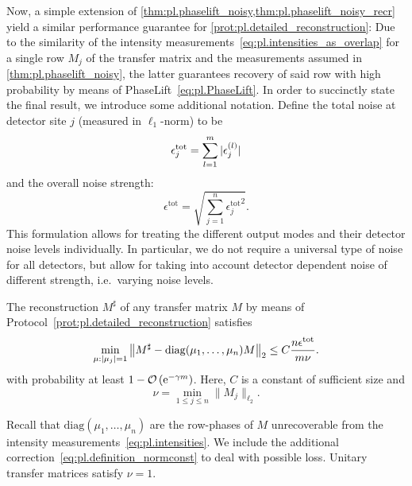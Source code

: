 Now, a simple extension of \cref{thm:pl.phaselift_noisy,thm:pl.phaselift_noisy_recr} yield a similar performance guarantee for \cref{prot:pl.detailed_reconstruction}:
Due to the similarity of the intensity measurements~\eqref{eq:pl.intensities_as_overlap} for a single row $M_j$ of the transfer matrix and the measurements assumed in \cref{thm:pl.phaselift_noisy}, the latter guarantees recovery of said row with high probability by means of PhaseLift~\eqref{eq:pl.PhaseLift}.
In order to succinctly state the final result, we introduce some additional notation.
Define the total noise at detector site $j$ (measured in $\ell_1$-norm) to be
\[
  \epsilon_j^{\mathrm{tot}}= \sum_{l=1}^m {\vert\epsilon_j^{(l)}\vert}
  \label{eq:pl.error_term_summand}
\]
and the overall noise strength:
\[
  \epsilon^{\mathrm{tot}} = \sqrt{ \sum_{j=1}^n {\epsilon_j^{\mathrm{tot}}}^2}.
\]
This formulation allows for treating the different output modes and their detector noise levels individually.
In particular, we do not require a universal type of noise for all detectors, but allow for taking into account detector dependent noise of different strength, i.e.\ varying noise levels.

\begin{corollary}%
  \label{cor:pl.performance_guarantee}
  The reconstruction ${M}^\sharp$ of any transfer matrix ${M}$ by means of Protocol~\ref{prot:pl.detailed_reconstruction} satisfies
    \[
      \min_{{\mu}: {\vert\mu_j\vert} = 1} \left\|  {M}^\sharp -  \mathrm{diag}(\mu_1,\ldots,\mu_n) {M} \right\|_2
      \leq C \frac{n \epsilon^\mathrm{tot}}{m \nu}.
      \label{eq:pl.total_bound}
    \]
  with probability at least $1 - {\mathcal{O}} \left( \mathrm{e}^{-\gamma m}\right)$.
  Here, $C$ is a constant of sufficient size and
  \[
    \nu = \min_{1 \leq j \leq n} \| {M}_j \|_{\ell_2}.
    \label{eq:pl.definition_normconst}
  \]
\end{corollary}
Recall that $\mathrm{diag}(\mu_1, \ldots, \mu_n)$ are the row-phases of ${M}$ unrecoverable from the intensity measurements~\eqref{eq:pl.intensities}.
We include the additional correction~\eqref{eq:pl.definition_normconst} to deal with possible loss.
Unitary transfer matrices satisfy $\nu = 1$.

